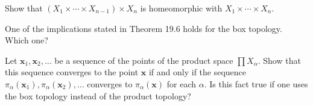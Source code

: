   \begin{exercise}[Munkres 19.4]
    Show that $(X_1 \times \cdots \times X_{n-1}) \times X_n$ is homeomorphic with $X_1 \times \cdots \times X_n$.
  \end{exercise}

  \begin{exercise}[Munkres 19.5]
    One of the implications stated in Theorem 19.6 holds for the box topology. Which one?
  \end{exercise}

  \begin{exercise}[Munkres 19.6]
    Let $\mathbf{x}_1, \mathbf{x}_2, \ldots$ be a sequence of the points of the product space $\prod X_\alpha$. Show that this sequence converges to the point $\mathbf{x}$ if and only if the sequence $\pi_\alpha(\mathbf{x}_1), \pi_\alpha(\mathbf{x}_2), \ldots$ converges to $\pi_\alpha(\mathbf{x})$ for each $\alpha$. Is this fact true if one uses the box topology instead of the product topology?
  \end{exercise}

